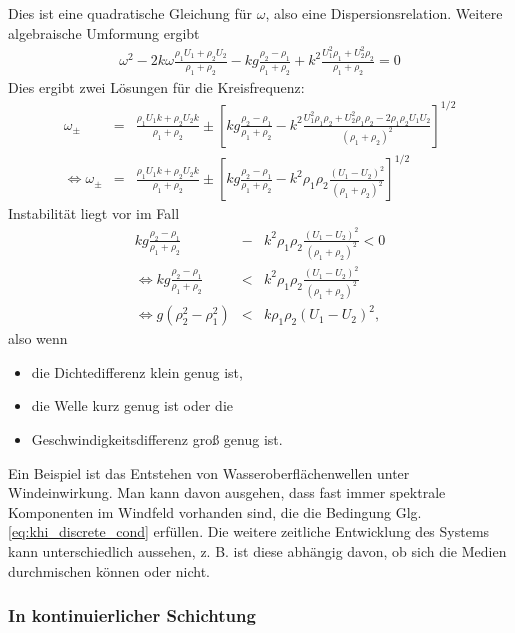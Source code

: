 \documentclass{book}
\begin{document}
%
Dies ist eine quadratische Gleichung für $\omega$, also eine Dispersionsrelation. Weitere algebraische Umformung ergibt
%
\begin{eqnarray}
\omega^2 - 2k\omega\frac{\rho_1U_1 + \rho_2U_2}{\rho_1 + \rho_2} - kg\frac{\rho_2 - \rho_1}{\rho_1 + \rho_2} + k^2\frac{U_1^2\rho_1 + U_2^2\rho_2}{\rho_1 + \rho_2} = 0
\end{eqnarray}
%
Dies ergibt zwei Lösungen für die Kreisfrequenz:
%
\begin{eqnarray}
\omega_\pm & = & \frac{\rho_1U_1k + \rho_2U_2k}{\rho_1 + \rho_2} \pm \left[kg\frac{\rho_2 - \rho_1}{\rho_1 + \rho_2} - k^2\frac{U_1^2\rho_1\rho_2 + U_2^2\rho_1\rho_2 - 2\rho_1\rho_2U_1U_2}{\left(\rho_1 + \rho_2\right)^2}\right]^{1/2}\nonumber\\
\Leftrightarrow\omega_\pm & = & \frac{\rho_1U_1k + \rho_2U_2k}{\rho_1 + \rho_2} \pm \left[kg\frac{\rho_2 - \rho_1}{\rho_1 + \rho_2} - k^2\rho_1\rho_2\frac{\left(U_1 - U_2\right)^2}{\left(\rho_1 + \rho_2\right)^2}\right]^{1/2}
\end{eqnarray}
%
Instabilität liegt vor im Fall
%
\begin{eqnarray}
kg\frac{\rho_2 - \rho_1}{\rho_1 + \rho_2} & - & k^2\rho_1\rho_2\frac{\left(U_1 - U_2\right)^2}{\left(\rho_1 + \rho_2\right)^2} < 0\nonumber\\
\Leftrightarrow kg\frac{\rho_2 - \rho_1}{\rho_1 + \rho_2} & < & k^2\rho_1\rho_2\frac{\left(U_1 - U_2\right)^2}{\left(\rho_1 + \rho_2\right)^2}\nonumber\\
\Leftrightarrow g\left(\rho_2^2 - \rho_1^2\right) & < & k\rho_1\rho_2\left(U_1 - U_2\right)^2,\label{eq:khi_discrete_cond}
\end{eqnarray}
%
also wenn
%
\begin{itemize}
\item die Dichtedifferenz klein genug ist,
\item die Welle kurz genug ist oder die
\item Geschwindigkeitsdifferenz groß genug ist.
\end{itemize}
%
Ein Beispiel ist das Entstehen von Wasseroberflächenwellen unter Windeinwirkung. Man kann davon ausgehen, dass fast immer spektrale Komponenten im Windfeld vorhanden sind, die die Bedingung Glg. \eqref{eq:khi_discrete_cond} erfüllen. Die weitere zeitliche Entwicklung des Systems kann unterschiedlich aussehen, z. B. ist diese abhängig davon, ob sich die Medien durchmischen können oder nicht.

\subsubsection{In kontinuierlicher Schichtung}
\label{sec:in_kontinuierlicher_schichtung}
\end{document}
